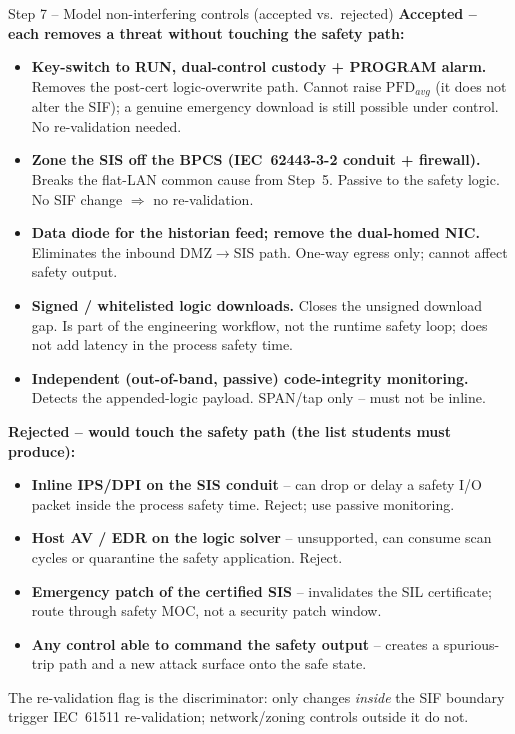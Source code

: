 \documentclass[11pt,a4paper]{article}
\begin{document}
\begin{solutionbox}{Step 7 -- Model non-interfering controls (accepted vs.\ rejected)}
\textbf{Accepted -- each removes a threat without touching the safety path:}
\begin{itemize}[leftmargin=*, nosep]
  \item \textbf{Key-switch to RUN, dual-control custody + PROGRAM alarm.}
        Removes the post-cert logic-overwrite path. Cannot raise
        $\mathrm{PFD}_{avg}$ (it does not alter the SIF); a genuine emergency
        download is still possible under control. No re-validation needed.
  \item \textbf{Zone the SIS off the BPCS (IEC~62443-3-2 conduit + firewall).}
        Breaks the flat-LAN common cause from Step~5. Passive to the safety
        logic. No SIF change $\Rightarrow$ no re-validation.
  \item \textbf{Data diode for the historian feed; remove the dual-homed NIC.}
        Eliminates the inbound DMZ$\to$SIS path. One-way egress only; cannot
        affect safety output.
  \item \textbf{Signed / whitelisted logic downloads.} Closes the unsigned
        download gap. Is part of the engineering workflow, not the runtime
        safety loop; does not add latency in the process safety time.
  \item \textbf{Independent (out-of-band, passive) code-integrity monitoring.}
        Detects the appended-logic payload. SPAN/tap only -- must not be
        inline.
\end{itemize}
\textbf{Rejected -- would touch the safety path (the list students must
produce):}
\begin{itemize}[leftmargin=*, nosep]
  \item \textbf{Inline IPS/DPI on the SIS conduit} -- can drop or delay a
        safety I/O packet inside the process safety time. Reject; use passive
        monitoring.
  \item \textbf{Host AV / EDR on the logic solver} -- unsupported, can consume
        scan cycles or quarantine the safety application. Reject.
  \item \textbf{Emergency patch of the certified SIS} -- invalidates the SIL
        certificate; route through safety MOC, not a security patch window.
  \item \textbf{Any control able to command the safety output} -- creates a
        spurious-trip path and a new attack surface onto the safe state.
\end{itemize}
The re-validation flag is the discriminator: only changes \emph{inside} the
SIF boundary trigger IEC~61511 re-validation; network/zoning controls outside
it do not.
\end{solutionbox}
\end{document}

